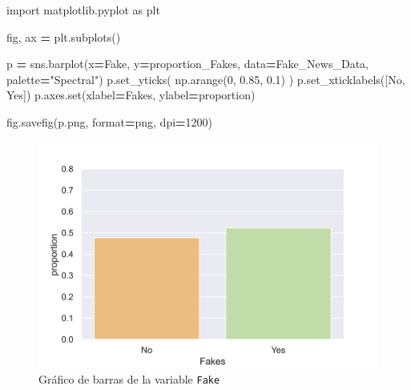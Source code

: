 \documentclass[
  11pt,
  a4paper,
]{article}
\newenvironment{Shaded}{\begin{snugshade}}{\end{snugshade}}
\newcommand{\BuiltInTok}[1]{#1}
\newcommand{\DecValTok}[1]{\textcolor[rgb]{0.00,0.00,0.81}{#1}}
\newcommand{\FloatTok}[1]{\textcolor[rgb]{0.00,0.00,0.81}{#1}}
\newcommand{\ImportTok}[1]{#1}
\newcommand{\NormalTok}[1]{#1}
\newcommand{\OperatorTok}[1]{\textcolor[rgb]{0.81,0.36,0.00}{\textbf{#1}}}
\newcommand{\StringTok}[1]{\textcolor[rgb]{0.31,0.60,0.02}{#1}}
\begin{document}
\begin{Shaded}
\begin{Highlighting}[]
\ImportTok{import}\NormalTok{ matplotlib.pyplot }\ImportTok{as}\NormalTok{ plt}

\NormalTok{fig, ax }\OperatorTok{=}\NormalTok{ plt.subplots()}


\NormalTok{p }\OperatorTok{=}\NormalTok{ sns.barplot(x}\OperatorTok{=}\StringTok{\textquotesingle{}Fake\textquotesingle{}}\NormalTok{, y}\OperatorTok{=}\StringTok{\textquotesingle{}proportion\_Fakes\textquotesingle{}}\NormalTok{, data}\OperatorTok{=}\NormalTok{Fake\_News\_Data, palette}\OperatorTok{=}\StringTok{"Spectral"}\NormalTok{) }
\NormalTok{p.set\_yticks( np.arange(}\DecValTok{0}\NormalTok{, }\FloatTok{0.85}\NormalTok{, }\FloatTok{0.1}\NormalTok{)  )}
\NormalTok{p.set\_xticklabels([}\StringTok{\textquotesingle{}No\textquotesingle{}}\NormalTok{, }\StringTok{\textquotesingle{}Yes\textquotesingle{}}\NormalTok{])}
\NormalTok{p.axes.}\BuiltInTok{set}\NormalTok{(xlabel}\OperatorTok{=}\StringTok{\textquotesingle{}Fakes\textquotesingle{}}\NormalTok{, ylabel}\OperatorTok{=}\StringTok{\textquotesingle{}proportion\textquotesingle{}}\NormalTok{)}

\NormalTok{fig.savefig(}\StringTok{\textquotesingle{}p.png\textquotesingle{}}\NormalTok{, }\BuiltInTok{format}\OperatorTok{=}\StringTok{\textquotesingle{}png\textquotesingle{}}\NormalTok{, dpi}\OperatorTok{=}\DecValTok{1200}\NormalTok{)}
\end{Highlighting}
\end{Shaded}

\begin{figure}
\centering
\includegraphics{p.png}
\caption{Gráfico de barras de la variable \texttt{Fake}}
\end{figure}
\end{document}
